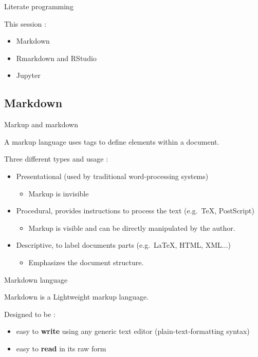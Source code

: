 \begin{frame}{Literate programming}

This session :
\begin{itemize}
  \item Markdown
  \item Rmarkdown and RStudio
  \item Jupyter
\end{itemize}

\end{frame}

\subsection{Markdown}

\begin{frame}{Markup and markdown}

\begin{definition}
A markup language uses tags to define elements within a document.
\end{definition}
\vfill
Three different types and usage :
\begin{itemize}
  \item Presentational (used by traditional word-processing systems)
  \begin{itemize}
      \item Markup is invisible
  \end{itemize}
  \item Procedural, provides instructions to process the text (e.g.\ TeX, PostScript)
  \begin{itemize}
      \item Markup is visible and can be directly manipulated by the author.
  \end{itemize}
  \item Descriptive, to label documents parts (e.g.\ LaTeX, HTML, XML...)
  \begin{itemize}
      \item Emphasizes the document structure.
  \end{itemize}
\end{itemize}

\end{frame}

\begin{frame}{Markdown language}

Markdown is a Lightweight markup language.

Designed to be :
\begin{itemize}
    \item easy to \textbf{write} using any generic text editor (plain-text-formatting syntax)
    \item easy to \textbf{read} in its raw form
\end{itemize}

\end{frame}

